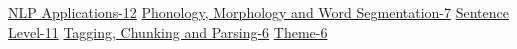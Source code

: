\begin{SingleTrackSchedule}
\hyperref[parallel-session-15B-trackD]{NLP Applications-12} \hfill \emph{\TrackDLoc} \newline
\hyperref[parallel-session-15B-trackE]{Phonology, Morphology and Word Segmentation-7} \hfill \emph{\TrackELoc} \newline
\hyperref[parallel-session-15B-trackF]{Sentence Level-11} \hfill \emph{\TrackFLoc} \newline
\hyperref[parallel-session-15B-trackG]{Tagging, Chunking and Parsing-6} \hfill \emph{\TrackGLoc} \newline
\hyperref[parallel-session-15B-trackH]{Theme-6} \hfill \emph{\TrackHLoc} \newline
\\
\end{SingleTrackSchedule}
